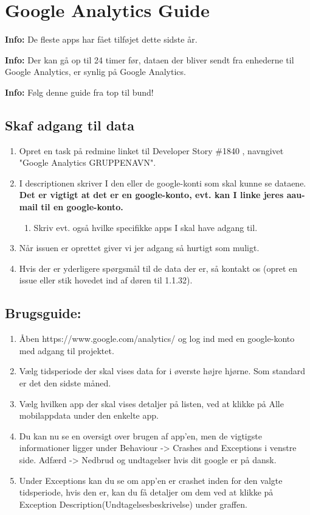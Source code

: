 \section{Google Analytics Guide} \label{Appendix_GoogleAnalyticsGuide}
\textbf{Info:} De fleste apps har fået tilføjet dette sidste år.

\textbf{Info:} Der kan gå op til 24 timer før, dataen der bliver sendt fra enhederne til Google Analytics, er synlig på Google Analytics.

\textbf{Info:} Følg denne guide fra top til bund!

\subsection{Skaf adgang til data}
\begin{enumerate}
	\item Opret en task på redmine linket til Developer Story \#1840 , navngivet "Google Analytics GRUPPENAVN".
	\item I descriptionen skriver I den eller de google-konti som skal kunne se dataene. \textbf{Det er vigtigt at det er en google-konto, evt. kan I linke jeres aau-mail til en google-konto.}
	\begin{enumerate}
		\item Skriv evt. også hvilke specifikke apps I skal have adgang til.
	\end{enumerate}
	\item Når issuen er oprettet giver vi jer adgang så hurtigt som muligt.
	\item Hvis der er yderligere spørgsmål til de data der er, så kontakt os (opret en issue eller stik hovedet ind af døren til 1.1.32).
\end{enumerate}

\subsection{Brugsguide:}
\begin{enumerate}
	\item Åben https://www.google.com/analytics/ og log ind med en google-konto med adgang til projektet.
	\item Vælg tidsperiode der skal vises data for i øverste højre hjørne. Som standard er det den sidste måned.
	\item Vælg hvilken app der skal vises detaljer på listen, ved at klikke på Alle mobilappdata under den enkelte app.
	\item Du kan nu se en oversigt over brugen af app'en, men de vigtigste informationer ligger under Behaviour -> Crashes and Exceptions i venstre side. Adfærd -> Nedbrud og undtagelser hvis dit google er på dansk.
	\item Under Exceptions kan du se om app'en er crashet inden for den valgte tidsperiode, hvis den er, kan du få detaljer om dem ved at klikke på Exception Description(Undtagelsesbeskrivelse) under graffen.
\end{enumerate}

